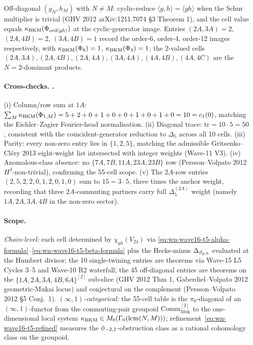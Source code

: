 Off-diagonal $(g_N, h_M)$ with $N \neq M$: cyclic-reduce
$\langle g, h \rangle = \langle gh \rangle$ when the Schur multiplier
is trivial (GHV 2012 arXiv:1211.7074 \S 3 Theorem 1), and the cell
value equals $\kappa_{\mathrm{BKM}}(\Phi_{\mathrm{ord}(gh)})$ at the cyclic-generator
image. Entries $(2A, 3A) = 2$, $(2A, 4B) = 2$, $(3A, 4B) = 1$ record
the order-6, order-4, order-12 images respectively, with
$\kappa_{\mathrm{BKM}}(\Phi_6) = 1$, $\kappa_{\mathrm{BKM}}(\Phi_4) = 1$; the $2$-valued cells
$(2A, 3A), (2A, 4B), (2A, 4A), (3A, 4A), (4A, 4B), (4A, 4C)$ are the
$N = 2$-dominant products.

\paragraph{Cross-checks. \ClaimStatusTheorem.}
(i) Column/row sum at $1A$: $\sum_M \kappa_{\mathrm{BKM}}(\Phi_{1,M}) = 5+2+0+1+0+0+1+0+1+0 = 10 = c_1(0)$,
matching the Eichler--Zagier Fourier-head normalisation.
(ii) Diagonal trace: $\mathrm{tr} = 10 \cdot 5 = 50$, consistent
with the coincident-generator reduction to $\Delta_5$ across all 10
cells.
(iii) Parity: every non-zero entry lies in $\{1, 2, 5\}$, matching the
admissible Gritsenko--Cl\'ery 2013 eight-weight list intersected
with integer weights (Wave-11 V3).
(iv) Anomalous-class absence: no $\{7A, 7B, 11A, 23A, 23B\}$ row
(Persson--Volpato 2012 $H^3$-non-trivial), confirming the 55-cell
scope.
(v) The $2A$-row entries $(2,5,2,2,0,1,2,0,1,0)$ sum to $15 = 3 \cdot 5$,
three times the anchor weight, recording that three $2A$-commuting
partners carry full $\Delta_5^{(2A)}$ weight (namely $1A, 2A, 3A, 4B$
in the non-zero sector).

\paragraph{Scope.}
\emph{Chain-level:} each cell determined by $\chi_{gh}(V_{24})$ via
\eqref{eq:wn-wave16-t5-alpha-formula}--\eqref{eq:wn-wave16-t5-beta-formula}
plus the Hecke-minus $\Delta_{\beta_{g,h}}$ evaluated at the Humbert divisor;
the 10 single-twining entries are theorems via Wave-15 L5 Cycles 3--5
and Wave-10 R2 waterfall; the 45 off-diagonal entries are theorems
on the $\{1A, 2A, 3A, 4B, 6A\}^{[2]}$ sub-slice (GHV 2012 Thm 1,
Gaberdiel--Volpato 2012 geometric-Mukai locus) and conjectural on
the complement (Persson--Volpato 2012 \S 5 Conj.~1).
\emph{$(\infty,1)$-categorical:} the 55-cell table is the
$\pi_0$-diagonal of an $(\infty,1)$-functor from the commuting-pair
groupoid $\mathrm{Comm}_{\mathrm{Muk}}^{[2]}$ to the one-dimensional
local system $\kappa_{\mathrm{BKM}} \in M_0(\Gamma_0(\mathrm{lcm}(N,M)))$;
refinement~\eqref{eq:wn-wave16-t5-refined} measures the
$\phi_{-2,1}$-obstruction class as a rational cohomology class on the
groupoid.

